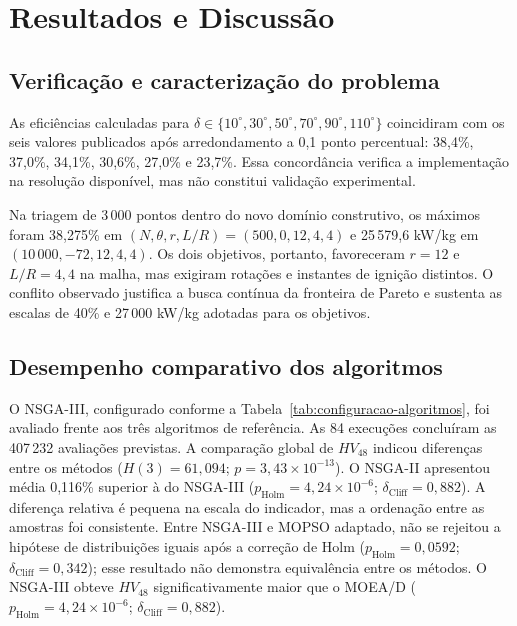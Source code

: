 \documentclass[a4paper,11pt]{article}
\begin{document}
\section{Resultados e Discussão}\label{sec:resultados}

\subsection{Verificação e caracterização do problema}

As eficiências calculadas para
$\delta\in\{10^\circ,30^\circ,50^\circ,70^\circ,90^\circ,110^\circ\}$
coincidiram com os seis valores publicados após arredondamento a 0,1 ponto
percentual: 38,4\%, 37,0\%, 34,1\%, 30,6\%, 27,0\% e 23,7\%. Essa concordância
verifica a implementação na resolução disponível, mas não constitui validação
experimental.

Na triagem de 3\,000 pontos dentro do novo domínio construtivo, os máximos
foram 38,275\% em $(N,\theta,r,L/R)=(500,0,12,4{,}4)$ e
25\,579,6 kW/kg em $(10\,000,-72,12,4{,}4)$. Os dois objetivos, portanto,
favoreceram $r=12$ e $L/R=4{,}4$ na malha, mas exigiram rotações e instantes de
ignição distintos. O conflito observado justifica a busca contínua da fronteira
de Pareto e sustenta as escalas de 40\% e 27\,000 kW/kg adotadas para os
objetivos.

\subsection{Desempenho comparativo dos algoritmos}

O NSGA-III, configurado conforme a Tabela~\ref{tab:configuracao-algoritmos}, foi
avaliado frente aos três algoritmos de referência. As 84 execuções concluíram
as 407\,232 avaliações previstas. A comparação global
de $HV_{48}$ indicou diferenças entre os métodos
($H(3)=61{,}094$; $p=3{,}43\times10^{-13}$). O NSGA-II apresentou média
0,116\% superior à do NSGA-III
($p_{\mathrm{Holm}}=4{,}24\times10^{-6}$;
$\delta_{\mathrm{Cliff}}=0{,}882$). A diferença relativa é pequena na escala
do indicador, mas a ordenação entre as amostras foi consistente. Entre
NSGA-III e MOPSO adaptado, não se rejeitou a hipótese de distribuições iguais
após a correção de Holm ($p_{\mathrm{Holm}}=0{,}0592$;
$\delta_{\mathrm{Cliff}}=0{,}342$); esse resultado não demonstra equivalência
entre os métodos. O NSGA-III obteve $HV_{48}$ significativamente maior que o
MOEA/D
($p_{\mathrm{Holm}}=4{,}24\times10^{-6}$;
$\delta_{\mathrm{Cliff}}=0{,}882$).
\end{document}
